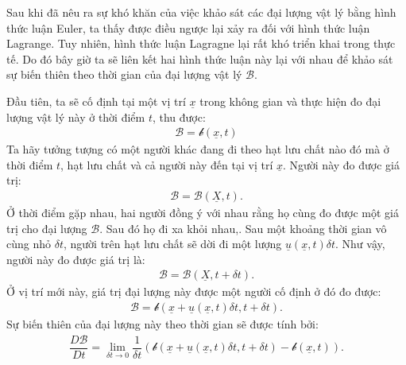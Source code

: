 \documentclass[../../../main.tex]{subfiles}
\begin{document}
	Sau khi đã nêu ra sự khó khăn của việc khảo sát các đại lượng vật lý bằng hình thức luận Euler, ta thấy được điều ngược lại xảy ra đối với hình thức luận Lagrange. Tuy nhiên, hình thức luận Lagragne lại rất khó triển khai trong thực tế. Do đó bây giờ ta sẽ liên kết hai hình thức luận này lại với nhau để khảo sát sự biến thiên theo thời gian của đại lượng vật lý $\mathscr{B}$.

	Đầu tiên, ta sẽ cố định tại một vị trí $\underline{x}$ trong không gian và thực hiện đo đại lượng vật lý này ở thời điểm $t$, thu được:
		\begin{align}
			\mathscr{B}=\mathscr{b}\left(\underline{x},t\right)
		\end{align}
	Ta hãy tưởng tượng có một người khác đang đi theo hạt lưu chất nào đó mà ở thời điểm $t$, hạt lưu chất và cả người này đến tại vị trí $\underline{x}$. Người này đo được giá trị:
		\begin{align}
			\mathscr{B}=\mathscr{B}\left(\underline{X},t\right).
		\end{align}
	Ở thời điểm gặp nhau, hai người đồng ý với nhau rằng họ cùng đo được một giá trị cho đại lượng $\mathscr{B}$. Sau đó họ đi xa khỏi nhau,. Sau một khoảng thời gian vô cùng nhỏ $\delta t$, người trên hạt lưu chất sẽ dời đi một lượng $\underline{u}\left(\underline{x},t\right)\delta t$. Như vậy, người này đo được giá trị là:
		\begin{align}
			\mathscr{B}=\mathscr{B}\left(\underline{X},t+\delta t\right).
		\end{align}
	Ở vị trí mới này, giá trị đại lượng này được một người cố định ở đó đo được:
		\begin{align}
			\mathscr{B}=\mathscr{b}\left(\underline{x}+\underline{u}\left(\underline{x},t\right)\delta t,t+\delta t\right).
		\end{align}
	Sự biến thiên của đại lượng này theo thời gian sẽ được tính bởi:
		\begin{align}\label{eq:Derivative_particulaire_def}
			\boxed{\dfrac{D\mathscr{B}}{Dt}=\lim\limits_{\delta t\rightarrow 0}\dfrac{1}{\delta t}\left(\mathscr{b}\left(\underline{x}+\underline{u}\left(\underline{x},t\right)\delta t,t+\delta t\right)-\mathscr{b}\left(\underline{x},t\right)\right)}.
		\end{align}
\end{document}
